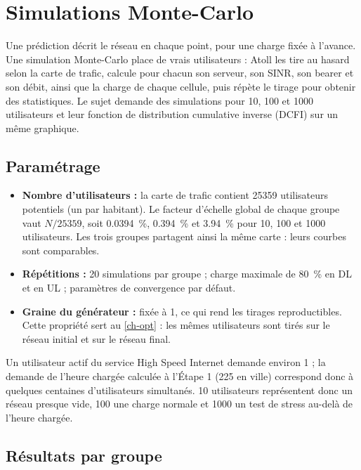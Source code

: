 \chapter{Simulations Monte-Carlo}
\label{ch-mc}

Une prédiction décrit le réseau en chaque point, pour une charge fixée à l'avance. Une simulation Monte-Carlo place de vrais utilisateurs : Atoll les tire au hasard selon la carte de trafic, calcule pour chacun son serveur, son SINR, son bearer et son débit, ainsi que la charge de chaque cellule, puis répète le tirage pour obtenir des statistiques. Le sujet demande des simulations pour 10, 100 et \num{1000} utilisateurs et leur fonction de distribution cumulative inverse (DCFI) sur un même graphique.

\section{Paramétrage}

\begin{itemize}
  \item \textbf{Nombre d'utilisateurs :} la carte de trafic contient \num{25359} utilisateurs potentiels (un par habitant). Le facteur d'échelle global de chaque groupe vaut $N / \num{25359}$, soit \SI{0,0394}{\percent}, \SI{0,394}{\percent} et \SI{3,94}{\percent} pour 10, 100 et \num{1000} utilisateurs. Les trois groupes partagent ainsi la même carte : leurs courbes sont comparables.
  \item \textbf{Répétitions :} 20 simulations par groupe ; charge maximale de \SI{80}{\percent} en DL et en UL ; paramètres de convergence par défaut.
  \item \textbf{Graine du générateur :} fixée à 1, ce qui rend les tirages reproductibles. Cette propriété sert au \cref{ch-opt} : les mêmes utilisateurs sont tirés sur le réseau initial et sur le réseau final.
\end{itemize}

Un utilisateur actif du service High Speed Internet demande environ \SI{1}{\Mbps} ; la demande de l'heure chargée calculée à l'Étape 1 (\SI{225}{\Mbps} en ville) correspond donc à quelques centaines d'utilisateurs simultanés. 10 utilisateurs représentent donc un réseau presque vide, 100 une charge normale et \num{1000} un test de stress au-delà de l'heure chargée.

\section{Résultats par groupe}

